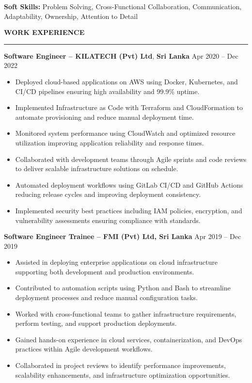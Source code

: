 \documentclass[10pt,letterpaper]{article}
\begin{document}
\textbf{Soft Skills:} Problem Solving, Cross-Functional Collaboration, Communication, Adaptability, Ownership, Attention to Detail

\vspace{8pt}

\textbf{WORK EXPERIENCE}\\[-8pt]
\noindent\rule{\textwidth}{1pt}

\vspace{-2pt}

\textbf{Software Engineer -- KILATECH (Pvt) Ltd}, \textbf{Sri Lanka} \hfill Apr 2020 -- Dec 2022

\vspace{-1pt}

\begin{itemize}
\item Deployed cloud-based applications on AWS using Docker, Kubernetes, and CI/CD pipelines ensuring high availability and 99.9\% uptime.
\item Implemented Infrastructure as Code with Terraform and CloudFormation to automate provisioning and reduce manual deployment time.
\item Monitored system performance using CloudWatch and optimized resource utilization improving application reliability and response times.
\item Collaborated with development teams through Agile sprints and code reviews to deliver scalable infrastructure solutions on schedule.
\item Automated deployment workflows using GitLab CI/CD and GitHub Actions reducing release cycles and improving deployment consistency.
\item Implemented security best practices including IAM policies, encryption, and vulnerability assessments ensuring compliance with standards.
\end{itemize}

\textbf{Software Engineer Trainee -- FMI (Pvt) Ltd, Sri Lanka} \hfill Apr 2019 -- Dec 2019

\vspace{-1pt}

\begin{itemize}
\item Assisted in deploying enterprise applications on cloud infrastructure supporting both development and production environments.
\item Contributed to automation scripts using Python and Bash to streamline deployment processes and reduce manual configuration tasks.
\item Worked with cross-functional teams to gather infrastructure requirements, perform testing, and support production deployments.
\item Gained hands-on experience in cloud services, containerization, and DevOps practices within Agile development workflows.
\item Collaborated in project reviews to identify performance improvements, scalability enhancements, and infrastructure optimization opportunities.
\end{itemize}
\end{document}
